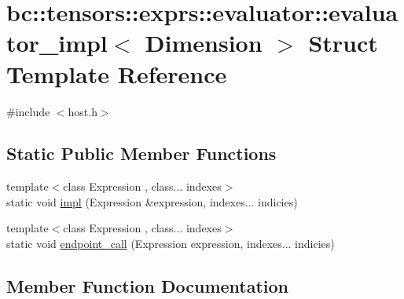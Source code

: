 \hypertarget{structbc_1_1tensors_1_1exprs_1_1evaluator_1_1evaluator__impl}{}\section{bc\+:\+:tensors\+:\+:exprs\+:\+:evaluator\+:\+:evaluator\+\_\+impl$<$ Dimension $>$ Struct Template Reference}
\label{structbc_1_1tensors_1_1exprs_1_1evaluator_1_1evaluator__impl}


{\ttfamily \#include $<$host.\+h$>$}

\subsection*{Static Public Member Functions}
\begin{DoxyCompactItemize}
\item 
{\footnotesize template$<$class Expression , class... indexes$>$ }\\static void \hyperlink{structbc_1_1tensors_1_1exprs_1_1evaluator_1_1evaluator__impl_a508144e14c82c035774382a50cec2a4e}{impl} (Expression \&expression, indexes... indicies)
\item 
{\footnotesize template$<$class Expression , class... indexes$>$ }\\static void \hyperlink{structbc_1_1tensors_1_1exprs_1_1evaluator_1_1evaluator__impl_a794270759debe1314fd54aa58972fffc}{endpoint\+\_\+call} (Expression expression, indexes... indicies)
\end{DoxyCompactItemize}


\subsection{Member Function Documentation}
\mbox{\label{structbc_1_1tensors_1_1exprs_1_1evaluator_1_1evaluator__impl_a794270759debe1314fd54aa58972fffc}} 
